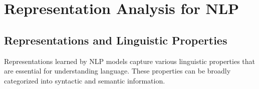 \section{Representation Analysis for NLP}

\subsection{Representations and Linguistic Properties}

Representations learned by NLP models capture various linguistic properties that are essential for understanding language. These properties can be broadly categorized into syntactic and semantic information.


